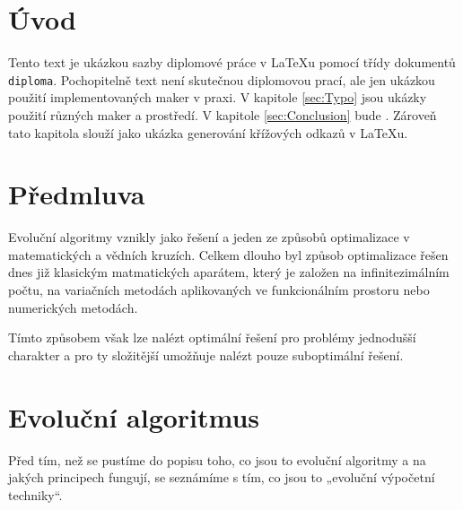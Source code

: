 \documentclass[bc,male,java,dept460]{diploma}		%
\begin{document}
\MakeTitlePages

\tableofcontents
\cleardoublepage	%

\listoftables
\cleardoublepage	%

\listoffigures
\cleardoublepage	%

\lstlistoflistings
\cleardoublepage	%

\section{Úvod}
\label{sec:Uvod}
Tento text je ukázkou sazby diplomové práce v \LaTeX{}u pomocí třídy dokumentů \verb|diploma|.
Pochopitelně text není skutečnou diplomovou prací, ale jen ukázkou použití
implementovaných maker v praxi. V kapitole \ref{sec:Typo} jsou ukázky použití
různých maker a prostředí. V kapitole \ref{sec:Conclusion} bude . Zároveň
tato kapitola slouží jako ukázka generování křížových odkazů v \LaTeX{}u.

\section{Předmluva}
\label{sec:Predmluva}
Evoluční algoritmy vznikly jako řešení a jeden ze způsobů optimalizace v matematických a vědních kruzích. Celkem dlouho byl způsob optimalizace řešen dnes již klasickým matmatických aparátem, který je založen na infinitezimálním počtu, na variačních metodách aplikovaných ve funkcionálním prostoru nebo numerických metodách.

Tímto způsobem však lze nalézt optimální řešení pro problémy jednodušší charakter a pro ty složitější umožňuje nalézt pouze suboptimální řešení.

\section{Evoluční algoritmus}
Před tím, než se pustíme do popisu toho, co jsou to evoluční algoritmy a na jakých principech fungují, se seznámíme s tím, co jsou to „evoluční výpočetní techniky“.
\end{document}

